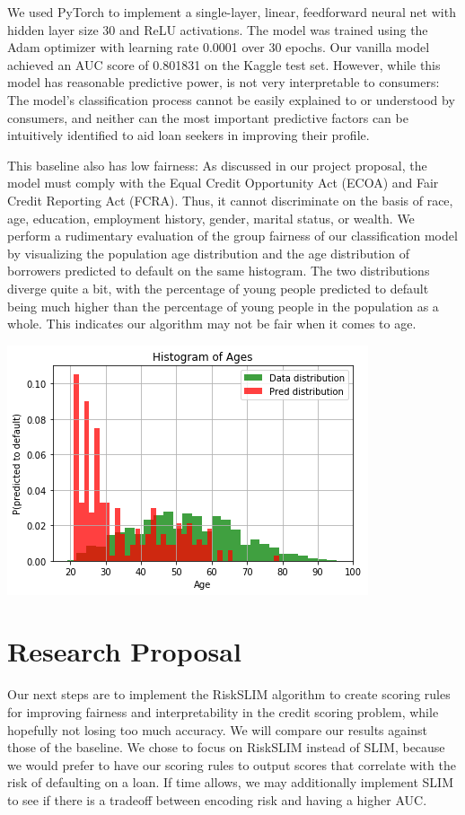 \documentclass[11pt, margin=1in]{article}
\begin{document}
We used PyTorch to implement a single-layer, linear, feedforward neural net with hidden layer size 30 and ReLU activations. The model was trained using the Adam optimizer with learning rate 0.0001 over 30 epochs. Our vanilla model achieved an AUC score of 0.801831 on the Kaggle test set. However, while this model has reasonable predictive power, is not very interpretable to consumers: The model's classification process cannot be easily explained to or understood by consumers, and neither can the most important predictive factors can be
intuitively identified to aid loan seekers in improving their profile. 

This baseline also has low fairness: As discussed in our project proposal, the model must comply with the Equal Credit Opportunity Act (ECOA) and Fair Credit Reporting Act (FCRA). Thus, it cannot discriminate on the basis of race, age, education, employment history, gender, marital status, or wealth. We perform a rudimentary evaluation of the group fairness of our classification model by visualizing the population age distribution and the age distribution of borrowers predicted to default on the same histogram. The two distributions diverge quite a bit, with the percentage of young people predicted to default being much higher than the percentage of young people in the population as a whole. This indicates our algorithm may not be fair when it comes to age.

\begin{center}
	\includegraphics[width=0.9\linewidth]{age-fairness}
\end{center}

\section{Research Proposal}
Our next steps are to implement the RiskSLIM algorithm to create scoring rules for improving fairness and interpretability in the credit scoring problem, while hopefully not losing too much accuracy.  We will compare our results against those of the baseline.  We chose to focus on RiskSLIM instead of SLIM, because we would prefer to have our scoring rules to output scores that correlate with the risk of defaulting on a loan.  If time allows, we may additionally implement SLIM to see if there is a tradeoff between encoding risk and having a higher AUC.  
\end{document}
